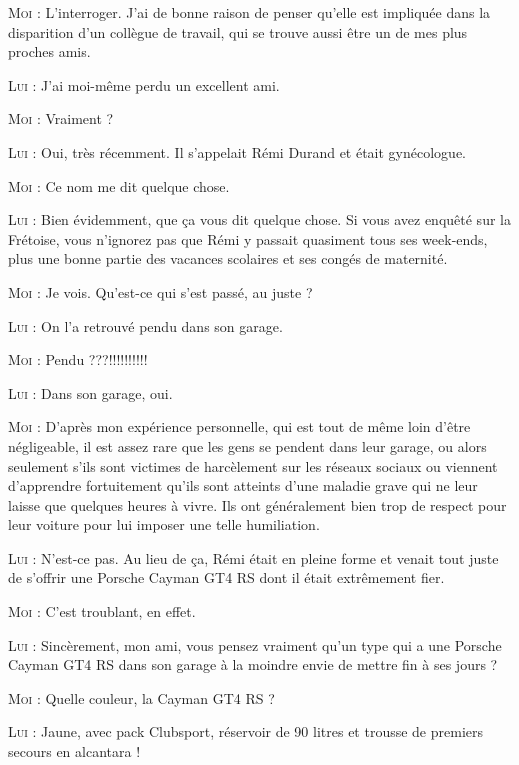 \begin{dialogue}
\textsc{Moi} : L’interroger. J’ai de bonne raison de penser qu’elle est impliquée dans la disparition d’un collègue de travail, qui se trouve aussi être un de mes plus proches amis.

\textsc{Lui} : J’ai moi-même perdu un excellent ami.

\textsc{Moi} : Vraiment ?

\textsc{Lui} : Oui, très récemment. Il s’appelait Rémi Durand et était gynécologue.

\textsc{Moi} : Ce nom me dit quelque chose.

\textsc{Lui} : Bien évidemment, que ça vous dit quelque chose. Si vous avez enquêté sur la Frétoise, vous n’ignorez pas que Rémi y passait quasiment tous ses week-ends, plus une bonne partie des vacances scolaires et ses congés de maternité.

\textsc{Moi} : Je vois. Qu’est-ce qui s’est passé, au juste ?

\textsc{Lui} : On l’a retrouvé pendu dans son garage.

\textsc{Moi} : Pendu ???!!!!!!!!!!

\textsc{Lui} : Dans son garage, oui.

\textsc{Moi} : D’après mon expérience personnelle, qui est tout de même loin d’être négligeable, il est assez rare que les gens se pendent dans leur garage, ou alors seulement s’ils sont victimes de harcèlement sur les réseaux sociaux ou viennent d’apprendre fortuitement qu’ils sont atteints d’une maladie grave qui ne leur laisse que quelques heures à vivre. Ils ont généralement bien trop de respect pour leur voiture pour lui imposer une telle humiliation.

\textsc{Lui} : N’est-ce pas. Au lieu de ça, Rémi était en pleine forme et venait tout juste de s’offrir une Porsche Cayman GT4 RS dont il était extrêmement fier.

\textsc{Moi} : C’est troublant, en effet.

\textsc{Lui} : Sincèrement, mon ami, vous pensez vraiment qu’un type qui a une Porsche Cayman GT4 RS dans son garage à la moindre envie de mettre fin à ses jours ?

\textsc{Moi} : Quelle couleur, la Cayman GT4 RS ?

\textsc{Lui} : Jaune, avec pack Clubsport, réservoir de 90 litres et trousse de premiers secours en alcantara !


\end{dialogue}
